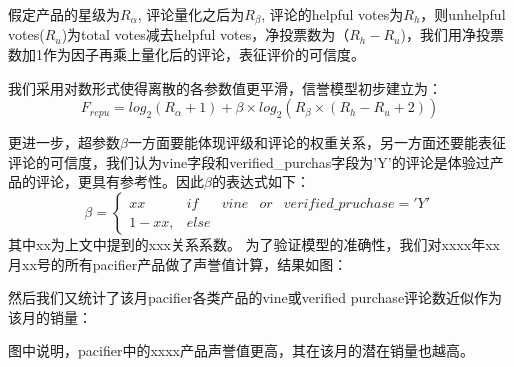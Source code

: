 \documentclass{mcmthesis}
\begin{document}
假定产品的星级为$R_{\alpha}$, 评论量化之后为$R_{\beta}$, 评论的helpful votes为$R_{h}$，则unhelpful votes($R_{u}$)为total votes减去helpful votes，净投票数为（$R_{h}-R_{u}$)，我们用净投票数加1作为因子再乘上量化后的评论，表征评价的可信度。

我们采用对数形式使得离散的各参数值更平滑，信誉模型初步建立为：
\begin{equation}
	F_{repu} =  log_2(R_{\alpha}+1)+ \beta \times log_2(R_{\beta}\times(R_{h}-R_{u}+2))
	\label{priA}
\end{equation}

更进一步，超参数$\beta$一方面要能体现评级和评论的权重关系，另一方面还要能表征评论的可信度，我们认为vine字段和verified\_purchas字段为'Y'的评论是体验过产品的评论，更具有参考性。因此$\beta$的表达式如下：
\begin{equation}
	\beta =\left\{\begin{matrix}
xx & if &vine &or &verified\_pruchase = 'Y'\\ 
1-xx,& else
\end{matrix}\right.
\label{hyperbeta}
\end{equation}
其中xx为上文中提到的xxx关系系数。
为了验证模型的准确性，我们对xxxx年xx月xx号的所有pacifier产品做了声誉值计算，结果如图：

然后我们又统计了该月pacifier各类产品的vine或verified purchase评论数近似作为该月的销量：

图中说明，pacifier中的xxxx产品声誉值更高，其在该月的潜在销量也越高。
\end{document}
